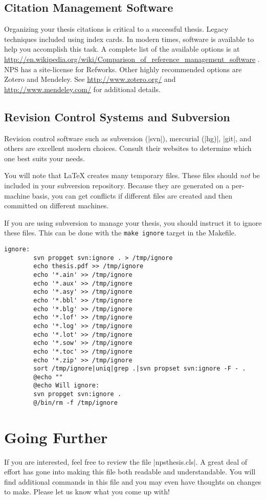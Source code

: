\subsection{Citation Management Software}
Organizing your thesis citations is critical to a successful thesis.  Legacy techniques included using index cards.
In modern times, software is available to help you accomplish this task.  A complete list of the available options is
at \url{http://en.wikipedia.org/wiki/Comparison_of_reference_management_software} .  NPS has a site-license for Refworks.
Other highly recommended options are Zotero and Mendeley.  See \url{http://www.zotero.org/} and \url{http://www.mendeley.com/}
for additional details.
   
\subsection{Revision Control Systems and Subversion}
Revision control software such as subversion (|svn|), mercurial (|hg)|, |git|, and others are excellent modern choices.  
Consult their websites to determine which one best suits your needs.

You will note that \LaTeX{} creates many temporary files. These files should \emph{not} be
included in your subversion repository. Because they are generated on a
per-machine basis, you can get conflicts if different files are
created and then committed on different machines.

If you are using subversion to manage your thesis, you should instruct it to ignore these files.  This
can be done with the \texttt{make ignore} target in the Makefile.

\begin{Verbatim}
ignore:
        svn propget svn:ignore . > /tmp/ignore
        echo thesis.pdf >> /tmp/ignore
        echo '*.ain' >> /tmp/ignore
        echo '*.aux' >> /tmp/ignore
        echo '*.asy' >> /tmp/ignore
        echo '*.bbl' >> /tmp/ignore
        echo '*.blg' >> /tmp/ignore
        echo '*.lof' >> /tmp/ignore
        echo '*.log' >> /tmp/ignore
        echo '*.lot' >> /tmp/ignore
        echo '*.sow' >> /tmp/ignore
        echo '*.toc' >> /tmp/ignore
        echo '*.zip' >> /tmp/ignore
        sort /tmp/ignore|uniq|grep .|svn propset svn:ignore -F - .
        @echo ""
        @echo Will ignore:
        svn propget svn:ignore .
        @/bin/rm -f /tmp/ignore
\end{Verbatim}



\section{Going Further}
If you are interested, feel free to review the file
|npsthesis.cls|. A great deal of effort has gone into making this
file both readable and understandable. You will find additional
commands in this file and you may even have thoughts on changes to
make. Please let us know what you come up with!


